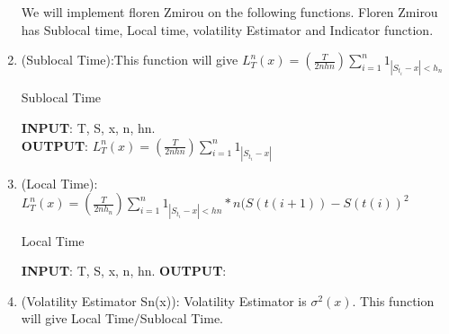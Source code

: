 \begin{enumerate}
\begin{algorithm}
\begin{algorithmic}[1]
\end{algorithmic}
\end{algorithm}
We will implement floren Zmirou on the following functions. Floren Zmirou has Sublocal time, Local time, volatility Estimator and Indicator function.
\item (Sublocal Time):This function will give $L_{T}^n(x) = (\frac{T}{2nhn}) \sum_{i =1}^ n 1_{\left\vert S_{t_i} - x \right\vert < h_n}$
\begin{algorithm}
\caption{Sublocal Time}
\bigskip
\textbf{INPUT}: T, S, x, n, hn.\\
\textbf{OUTPUT}: $L_{T}^n(x) = (\frac{T}{2nhn}) \sum_{i =1}^ n 1_{\left\vert S_{t_i} - x\right\vert }$
\end{algorithm}
\item (Local Time): $L_{T}^n(x) = (\frac{T}{2nh_n}) \sum_{i =1}^ n 1_{\left\vert S_{t_i} - x\right\vert  < hn}*n(S(t(i+1))-S(t(i))^2$
\begin{algorithm}
\caption{Local Time}
\bigskip
\textbf{INPUT}: T, S, x, n, hn.
\textbf{OUTPUT}:
\end{algorithm}
\item (Volatility Estimator Sn(x)): Volatility Estimator is $\sigma^2(x)$. This function will give Local Time$/$Sublocal Time.
\begin{algorithm}

\end{algorithm}
\end{enumerate}
